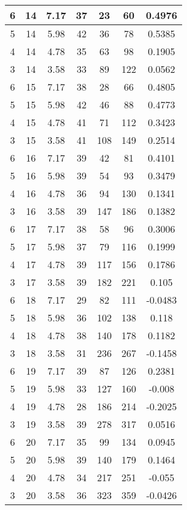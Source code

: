 \documentclass[letterpaper, 12pt]{article}
\begin{document}
\begin{longtable}{|c|c|c|c|c|c|c|}
\hline
6 & 14 & 7.17 & 37 & 23 & 60 & 0.4976 \\
\hline
5 & 14 & 5.98 & 42 & 36 & 78 & 0.5385 \\
\hline
4 & 14 & 4.78 & 35 & 63 & 98 & 0.1905 \\
\hline
3 & 14 & 3.58 & 33 & 89 & 122 & 0.0562 \\
\hline
6 & 15 & 7.17 & 38 & 28 & 66 & 0.4805 \\
\hline
5 & 15 & 5.98 & 42 & 46 & 88 & 0.4773 \\
\hline
4 & 15 & 4.78 & 41 & 71 & 112 & 0.3423 \\
\hline
3 & 15 & 3.58 & 41 & 108 & 149 & 0.2514 \\
\hline
6 & 16 & 7.17 & 39 & 42 & 81 & 0.4101 \\
\hline
5 & 16 & 5.98 & 39 & 54 & 93 & 0.3479 \\
\hline
4 & 16 & 4.78 & 36 & 94 & 130 & 0.1341 \\
\hline
3 & 16 & 3.58 & 39 & 147 & 186 & 0.1382 \\
\hline
6 & 17 & 7.17 & 38 & 58 & 96 & 0.3006 \\
\hline
5 & 17 & 5.98 & 37 & 79 & 116 & 0.1999 \\
\hline
4 & 17 & 4.78 & 39 & 117 & 156 & 0.1786 \\
\hline
3 & 17 & 3.58 & 39 & 182 & 221 & 0.105 \\
\hline
6 & 18 & 7.17 & 29 & 82 & 111 & -0.0483 \\
\hline
5 & 18 & 5.98 & 36 & 102 & 138 & 0.118 \\
\hline
4 & 18 & 4.78 & 38 & 140 & 178 & 0.1182 \\
\hline
3 & 18 & 3.58 & 31 & 236 & 267 & -0.1458 \\
\hline
6 & 19 & 7.17 & 39 & 87 & 126 & 0.2381 \\
\hline
5 & 19 & 5.98 & 33 & 127 & 160 & -0.008 \\
\hline
4 & 19 & 4.78 & 28 & 186 & 214 & -0.2025 \\
\hline
3 & 19 & 3.58 & 39 & 278 & 317 & 0.0516 \\
\hline
6 & 20 & 7.17 & 35 & 99 & 134 & 0.0945 \\
\hline
5 & 20 & 5.98 & 39 & 140 & 179 & 0.1464 \\
\hline
4 & 20 & 4.78 & 34 & 217 & 251 & -0.055 \\
\hline
3 & 20 & 3.58 & 36 & 323 & 359 & -0.0426 \\
\hline
\end{longtable}
\end{document}
